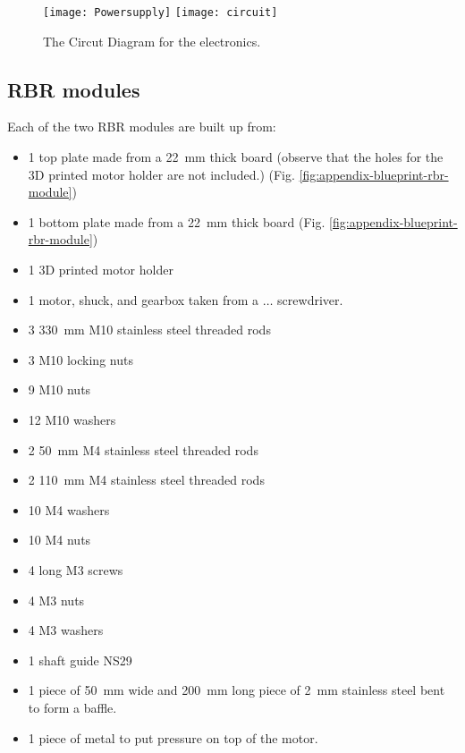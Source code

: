 \begin{figure}[htbp]
  \centering
  \texttt{[image: Powersupply]}
  \texttt{[image: circuit]}

  \caption{The Circut Diagram for the electronics.}
  \label{fig:appendix-circuit-diagrams}

\end{figure}

\subsection{RBR modules}

Each of the two RBR modules are built up from:

\begin{itemize}
  \item 1 top plate made from a 22~mm thick board (observe that the holes for
    the 3D printed motor holder are not included.) (Fig. \ref{fig:appendix-blueprint-rbr-module})
  \item 1 bottom plate made from a 22~mm thick board (Fig. \ref{fig:appendix-blueprint-rbr-module})
  \item 1 3D printed motor holder
  \item 1 motor, shuck, and gearbox taken from a $\dots$
    screwdriver.
  \item 3 330~mm M10 stainless steel threaded rods
  \item 3 M10 locking nuts
  \item 9 M10 nuts
  \item 12 M10 washers
  \item 2 50~mm M4 stainless steel threaded rods
  \item 2 110~mm M4 stainless steel threaded rods
  \item 10 M4 washers
  \item 10 M4 nuts
  \item 4 long M3 screws
  \item 4 M3 nuts
  \item 4 M3 washers
  \item 1 shaft guide NS29
  \item 1 piece of 50~mm wide and 200~mm long piece of 2~mm stainless steel
    bent to form a baffle.
  \item 1 piece of metal to put pressure on top of the motor.
\end{itemize}


